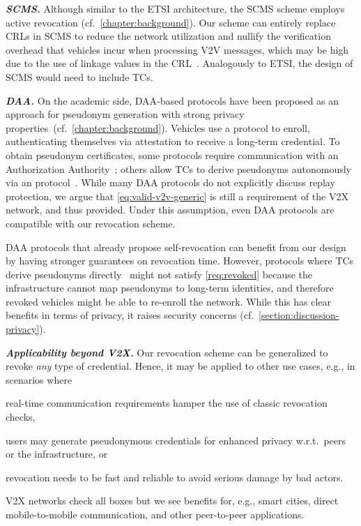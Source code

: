 \noindent\textbf{\emph{SCMS.}}
%
Although similar to the ETSI architecture, the \ac{SCMS} scheme employs active
revocation (cf.~\cref{chapter:background}). Our scheme can entirely replace
\acp{CRL} in \ac{SCMS} to reduce the network utilization and nullify the
verification overhead that vehicles incur when processing \ac{V2V} messages,
which may be high due to the use of linkage values in the
\ac{CRL}~\cite{brecht2018scms}. Analogously to ETSI, the design of \ac{SCMS}
would need to include \acp{TC}.

\noindent\textbf{\emph{DAA.}}
%
On the academic side, \ac{DAA}-based protocols have been proposed as an approach
for pseudonym generation with strong privacy
properties~(cf.~\cref{chapter:background}). Vehicles use a \funcjoin{} protocol
to enroll, authenticating themselves via attestation to receive a long-term
credential. To obtain pseudonym certificates, some protocols require
communication with an Authorization Authority~\cite{hicks2020vehicular}; others
allow \acp{TC} to derive pseudonyms autonomously via an \funcissue{}
protocol~\cite{whitefield2017privacy,desmoulins2019practical}. While many
\ac{DAA} protocols do not explicitly discuss replay protection, we argue that
\cref{eq:valid-v2v-generic} is still a requirement of the \ac{V2X} network, and
thus provided. Under this assumption, even \ac{DAA} protocols are compatible
with our revocation scheme.

\ac{DAA} protocols that already propose self-revocation can benefit from our
design by having stronger guarantees on revocation time. However, protocols
where \acp{TC} derive pseudonyms
directly~\cite{whitefield2017privacy,desmoulins2019practical} might not satisfy
\cref{req:revoked} because the infrastructure cannot map pseudonyms to long-term
identities, and therefore revoked vehicles might be able to re-enroll the
network. While this has clear benefits in terms of privacy, it raises security
concerns (cf.~\cref{section:discussion-privacy}).

\noindent\textbf{\emph{Applicability beyond \ac{V2X}.}}
%
Our revocation scheme can be generalized to revoke \emph{any} type of
credential. Hence, it may be applied to other use cases, e.g., in scenarios
where
\begin{inparaenum}
\item real-time communication requirements hamper the use of classic revocation
  checks,
\item users may generate pseudonymous credentials for enhanced privacy
  w.r.t.~peers or the infrastructure, or
\item revocation needs to be fast and reliable to avoid serious damage by bad
  actors.
\end{inparaenum}
V2X networks check all boxes but we see benefits for, e.g., smart
cities, direct mobile-to-mobile communication, and other peer-to-peer
applications.

